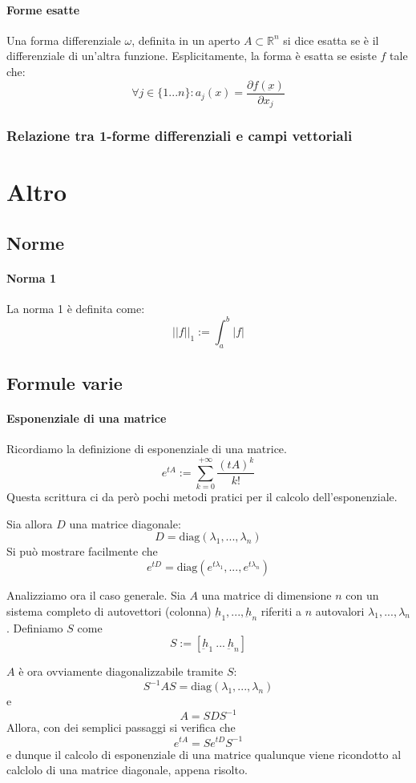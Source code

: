 \documentclass[a4paper,12pt]{article}
\begin{document}
\paragraph{Forme esatte}
Una forma differenziale $\omega$, definita in un aperto $A\subset\mathbb{R}^n$ si dice esatta se è il differenziale di un'altra funzione.
Esplicitamente, la forma è esatta se esiste $f$ tale che:
$$\forall j\in\{1 ... n\}: a_j(x) = \frac{\partial f(\underbar{x})}{\partial x_j}$$
\subsubsection{Relazione tra 1-forme differenziali e campi vettoriali}

\section{Altro}
\subsection{Norme}
\paragraph{Norma 1}
La norma 1 è definita come:
$$||f||_1 := \int_a^b|f|$$
\subsection{Formule varie}
\paragraph{Esponenziale di una matrice}
Ricordiamo la definizione di esponenziale di una matrice.
$$e^{tA} := \sum_{k=0}^{+\infty} \dfrac{(tA)^k}{k!}$$
Questa scrittura ci da però pochi metodi pratici per il calcolo dell'esponenziale.

Sia allora $D$ una matrice diagonale:
$$D=\text{diag}(\lambda_1,...,\lambda_n)$$
Si può mostrare facilmente che
$$e^{tD} = \text{diag}(e^{t\lambda_1}, ..., e^{t\lambda_n})$$

Analizziamo ora il caso generale.
Sia $A$ una matrice di dimensione $n$ con un sistema completo di autovettori (colonna) $\underbar{h}_1, ..., \underbar{h}_n$ riferiti a $n$ autovalori $\lambda_1, ..., \lambda_n$. Definiamo $S$ come
$$S:=[\underbar{h}_1\ ...\ \underbar{h}_n]$$

$A$ è ora ovviamente diagonalizzabile tramite $S$:
$$S^{-1}AS=\text{diag}(\lambda_1,...,\lambda_n)$$
e
$$A = SDS^{-1}$$
Allora, con dei semplici passaggi si verifica che
$$e^{tA} = Se^{tD}S^{-1}$$
e dunque il calcolo di esponenziale di una matrice qualunque viene ricondotto al calclolo di una matrice diagonale, appena risolto.
\end{document}
